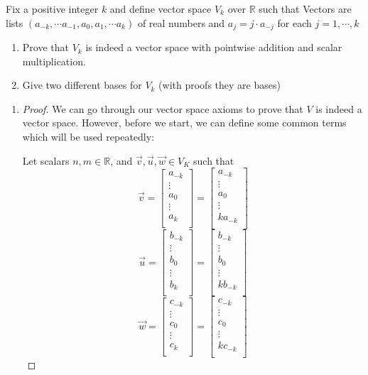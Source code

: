 \documentclass[11pt]{article}
\newcommand{\vect}[1]{\begin{bmatrix}#1\end{bmatrix}}
\newcommand{\R}{\mathbb{R}}
\begin{document}
\begin{problem}[Problem 6]
    Fix a positive integer $k$ and define vector space $V_k$ over $\R$ such that Vectors are lists $(a_{-k}, \cdots a_{-1}, a_0, a_1, \cdots a_k)$ of real numbers and $a_j = j\cdot a_{-j}$ for each $j=1, \cdots, k$

    \begin{enumerate}[label=\arabic*.]
        \item Prove that $V_k$ is indeed a vector space with pointwise addition and scalar multiplication.
        \item Give two different bases for $V_k$ (with proofs they are bases)
    \end{enumerate}
\end{problem}
    \begin{enumerate}[label=\arabic*.]
        \item \begin{proof} We can go through our vector space axioms to prove that $V$ is indeed a vector space. However, before we start, we can define some common terms which will be used repeatedly:

        Let scalars $n, m \in \R$, and $\vec{v}, \vec{u}, \vec{w} \in V_K$ such that
        $$\vec{v} = \vect{a_{-k} \\ \vdots \\a_0 \\ \vdots \\ a_k \\} = \vect{a_{-k} \\ \vdots \\a_0 \\ \vdots \\ k a_{-k} \\}$$
        $$\vec{u} = \vect{b_{-k} \\ \vdots \\b_0 \\ \vdots \\ b_k \\} = \vect{b_{-k} \\ \vdots \\b_0 \\ \vdots \\ k b_{-k} \\}$$
        $$\vec{w} = \vect{c_{-k} \\ \vdots \\c_0 \\ \vdots \\ c_k \\} = \vect{c_{-k} \\ \vdots \\c_0 \\ \vdots \\ k c_{-k} \\}$$


\end{proof}
\end{enumerate}
\end{document}
